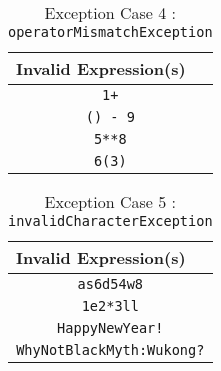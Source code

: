 \documentclass[UTF8]{ctexart}
\begin{document}
\begin{table}[!ht]
    \centering
    \begin{tabular}{|c|}
    \hline
    \multicolumn{1}{|l|}{Invalid Expression(s)} \\ \hline
    \texttt{1+}                              \\ \hline
    \texttt{() - 9}                                       \\ \hline
    \texttt{5**8}                                       \\ \hline
    \texttt{6(3)}                                     \\ \hline
    \end{tabular}
    \caption{Exception Case 4 : \texttt{operatorMismatchException}}
\end{table}


\begin{table}[!ht]
    \centering
    \begin{tabular}{|c|}
    \hline
    \multicolumn{1}{|l|}{Invalid Expression(s)} \\ \hline
    \texttt{as6d54w8}                              \\ \hline
    \texttt{1e2*3ll}                                     \\ \hline
    \texttt{HappyNewYear!}                                       \\ \hline
    \texttt{WhyNotBlackMyth:Wukong?}                                     \\ \hline
    \end{tabular}
    \caption{Exception Case 5 : \texttt{invalidCharacterException}}
\end{table}
\end{document}

